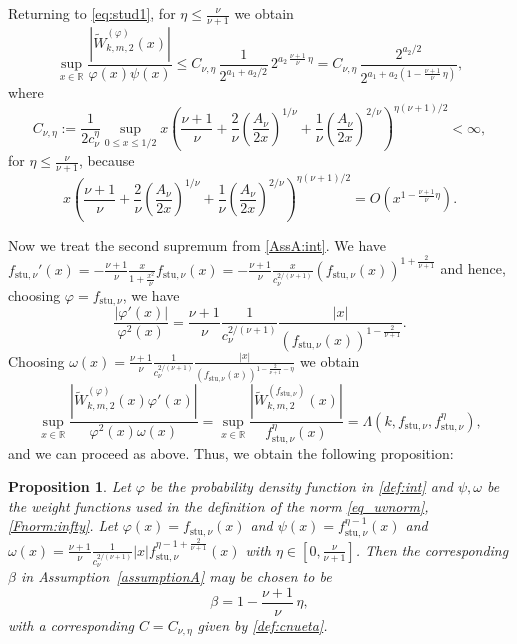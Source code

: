 \documentclass[namedate,webpdf,imanum]{ima-authoring-arxiv}%
\theoremstyle{thmstyletwo}%
\newtheorem{proposition}{Proposition}%
\numberwithin{equation}{section}
\newcommand{\stu}{\mathrm{stu}}
\begin{document}
Returning to \eqref{eq:stud1}, for $\eta \le \frac{\nu}{\nu+1}$ we obtain
$$\sup_{x \in \mathbb{R}} \frac{|\widetilde{W}^{(\varphi)}_{k, m, 2}(x)|}{\varphi(x) \psi(x)} \le C_{\nu,\eta} \, \frac{1}{2^{a_1+a_2/2}} \, 2^{a_2 \,  \frac{\nu+1}{\nu}\, \eta} = C_{\nu,\eta} \, \frac{2^{a_2/2}}{2^{a_1+a_2(1-\frac{\nu+1}{\nu}\, \eta)}},$$ where 
\begin{equation}\label{def:cnueta}
C_{\nu,\eta}:=\frac{1}{2 c_{\nu}^{\eta}} \sup_{0\le x \le 1/2} x \left(\frac{\nu+1}{\nu}+\frac{2}{\nu} \left(\frac{A_\nu}{2 x} \right)^{1/\nu} + \frac{1}{\nu} \left(\frac{A_\nu}{2 x} \right)^{2/\nu}\right)^{\eta(\nu+1)/2}< \infty,
\end{equation}
for $\eta \le \frac{\nu}{\nu+1}$, because 
$$x \left(\frac{\nu+1}{\nu}+\frac{2}{\nu} \left(\frac{A_\nu}{2 x} \right)^{1/\nu} + \frac{1}{\nu} \left(\frac{A_\nu}{2 x} \right)^{2/\nu}\right)^{\eta(\nu+1)/2}=O\left(x^{1-\frac{\nu+1}{\nu}\eta} \right).$$

Now we treat the second supremum from \eqref{AssA:int}. We have $f_{\stu,\nu}'(x)=-\frac{\nu+1}{\nu} \frac{x}{1+\frac{x^2}{\nu}} f_{\stu,\nu}(x)=-\frac{\nu+1}{\nu} \frac{x}{c_{\nu}^{2/(\nu+1)}} (f_{\stu,\nu}(x))^{1+\frac{2}{\nu+1}}$ and hence, choosing $\varphi=f_{\stu,\nu}$, we have $$\frac{|\varphi'(x)|}{\varphi^2(x)}= \frac{\nu+1}{\nu} \frac{1}{c_{\nu}^{2/(\nu+1)}}\frac{|x|}{(f_{\stu,\nu}(x))^{1-\frac{2}{\nu+1}}}.$$ Choosing $\omega(x)=\frac{\nu+1}{\nu} \frac{1}{c_{\nu}^{2/(\nu+1)}}\frac{|x|}{(f_{\stu,\nu}(x))^{1-\frac{2}{\nu+1}-\eta}}$ we obtain
$$\sup_{x \in \mathbb{R}} \frac{|\widetilde{W}_{k,m,2}^{(\varphi)}(x)\varphi'(x)|}{\varphi^2(x) \omega(x)} = \sup_{x \in \mathbb{R}} \frac{|\widetilde{W}_{k,m,2}^{(f_{\stu,\nu})}(x)|}{f_{\stu,\nu}^{\eta}(x)}=\Lambda(k,f_{\stu,\nu},f_{\stu,\nu}^{\eta}),$$ and we can proceed as above. Thus, we obtain the following proposition:%

\begin{proposition}\label{pr:beta3}
Let $\varphi$ be the probability density function in \eqref{def:int} and $\psi, \omega$ be the weight functions used in the definition of the norm \eqref{eq_uvnorm}, \eqref{Fnorm:infty}. Let $\varphi(x)=f_{\stu,\nu}(x)$ and $\psi(x)=f_{\stu,\nu}^{\eta-1}(x)$ and $\omega(x)=\frac{\nu+1}{\nu} \frac{1}{c_{\nu}^{2/(\nu+1)}}|x|f^{\eta-1+\frac{2}{\nu+1}}_{\stu,\nu}(x)$ with $\eta \in [0,\frac{\nu}{\nu+1}]$. Then the corresponding $\beta$ in Assumption~\ref{assumptionA} may be chosen to be $$\beta=1-\frac{\nu+1}{\nu}\, \eta,$$ with a corresponding $C=C_{\nu,\eta}$ given by \eqref{def:cnueta}.
\end{proposition}
\end{document}

